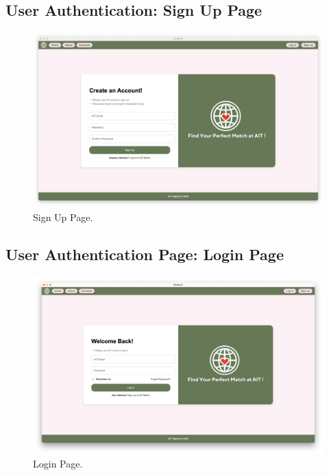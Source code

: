         \subsection{User Authentication: Sign Up Page}
        \begin{figure}[h]
                \centering
                \captionsetup{justification=centering, singlelinecheck=false, labelsep=space}
                \includegraphics[width=5in]{figures/results/landing-page/signup-page.png} 
                \caption{Sign Up Page.}
                \label{fig:signup-page}
            \end{figure}

        \subsection{User Authentication Page: Login Page}
        \begin{figure}[h]
                \centering
                \captionsetup{justification=centering, singlelinecheck=false, labelsep=space}
                \includegraphics[width=5in]{figures/results/landing-page/login-page.png} 
                \caption{Login Page.}
                \label{fig:login-page}
            \end{figure}
        \newpage
